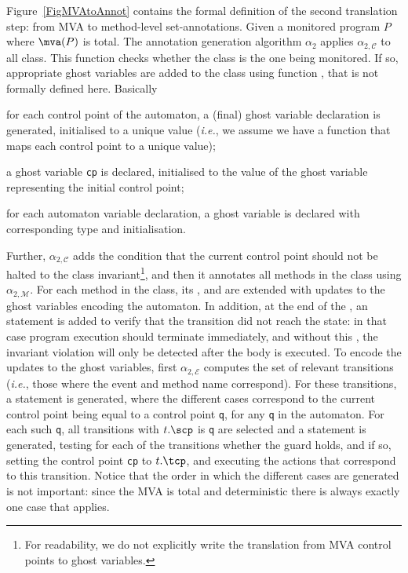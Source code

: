 Figure~\ref{FigMVAtoAnnot} contains the formal definition of the
second translation step: from MVA to method-level
set-annotations. Given a monitored program \(P\) where \(\mva(P)\) is
total. The annotation generation algorithm \(\alpha_2\) applies
\(\alpha_{2, \mathcal{C}}\) to all
class. This function checks whether the class is the one being
monitored. If so, appropriate ghost variables are added to the class
using function \newgvs, that is not formally defined here. Basically
\begin{inparaenum}
\item for each control point of the automaton, a (final) ghost
variable declaration is generated, initialised to a unique value
(\emph{i.e.}, we assume we have a function \unique that maps each
control point to a unique value);
\item a ghost variable \texttt{cp} is declared, initialised to the
value of the ghost variable representing the initial control point;
\item for each automaton variable declaration, a ghost variable is
declared with corresponding type and initialisation.
\end{inparaenum}
Further, \(\alpha_{2, \mathcal{C}}\) adds the condition that the
current control point should not be halted to the class
invariant\footnote{For readability, we do not explicitly write the
translation from MVA control points to ghost variables.}, and then it
annotates all methods in the class using \(\alpha_{2,
\mathcal{M}}\). For each method in the class, its \preset, \postset
and \excset are extended with updates to the ghost variables encoding
the automaton. In addition, at the end of the \preset, an \Assert
statement is added to verify that the transition did not reach the
\halted state: in that case program execution should terminate
immediately, and without this \Assert, the invariant violation will
only be detected after the body is executed. To encode the updates to
the ghost variables, first \(\alpha_{2, \mathcal{E}}\) computes the
set of relevant transitions (\emph{i.e.}, those where the event and
method name correspond). For these transitions, a \CaseJML
statement is generated, where the different cases correspond to the current
control point being equal to a control point \texttt{q}, for any
\texttt{q} in the automaton. For each such \texttt{q}, all transitions
with \(t.\scp\) is \texttt{q} are selected and a \CaseJML
statement is generated, testing for each of the transitions whether
the guard holds, and if so, setting the control point \texttt{cp} to
\(t.\tcp\), and executing the actions that correspond to this
transition.
Notice that the order in which the different cases are generated is
not important: since the MVA is total and deterministic there is
always exactly one case that applies.




